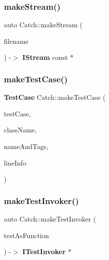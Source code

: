 \mbox{\label{namespace_catch_af6d27462573d60c30c51acf1c980e3ff}} 
\subsubsection{makeStream()}
{\footnotesize\ttfamily auto Catch\+::make\+Stream (\begin{DoxyParamCaption}\item[{\textbf{ String\+Ref} const \&}]{filename }\end{DoxyParamCaption}) -\/$>$  \textbf{ I\+Stream} const $\ast$}

\mbox{\label{namespace_catch_a5e63df38d06a43d4cee17454e724b5c0}} 
\subsubsection{makeTestCase()}
{\footnotesize\ttfamily \textbf{ Test\+Case} Catch\+::make\+Test\+Case (\begin{DoxyParamCaption}\item[{\textbf{ I\+Test\+Invoker} $\ast$}]{test\+Case,  }\item[{std\+::string const \&}]{class\+Name,  }\item[{\textbf{ Name\+And\+Tags} const \&}]{name\+And\+Tags,  }\item[{\textbf{ Source\+Line\+Info} const \&}]{line\+Info }\end{DoxyParamCaption})}

\mbox{\label{namespace_catch_ab3d8ccbc900fe50322c39ecbba52f536}} 
\subsubsection{makeTestInvoker()\hspace{0.1cm}{\footnotesize\ttfamily [1/2]}}
{\footnotesize\ttfamily auto Catch\+::make\+Test\+Invoker (\begin{DoxyParamCaption}\item[{void($\ast$)()}]{test\+As\+Function }\end{DoxyParamCaption}) -\/$>$  \textbf{ I\+Test\+Invoker} $\ast$\hspace{0.3cm}{\ttfamily [noexcept]}}

\mbox{\label{namespace_catch_a82a954c4d70afa716115820dc7dc8d24}} 
